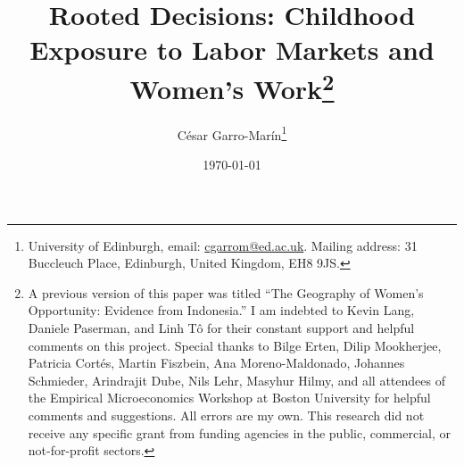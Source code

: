 \title{Rooted Decisions: Childhood Exposure to Labor Markets and Women's Work\thanks{A previous version of this paper was titled ``The Geography of Women's Opportunity: Evidence from Indonesia.'' I am indebted to Kevin Lang, Daniele Paserman, and Linh T\^o for their constant support and helpful comments on this project. Special thanks to Bilge Erten, Dilip Mookherjee, Patricia Cort\'es, Martin Fiszbein, Ana Moreno-Maldonado, Johannes Schmieder, Arindrajit Dube,  Nils Lehr, Masyhur Hilmy, and all attendees of the Empirical Microeconomics Workshop at Boston University for helpful comments and suggestions. All errors are my own. This research did not receive any specific grant from funding agencies in the public, commercial, or not-for-profit sectors.}}	
\date{\today}
\author{C\'esar Garro-Mar\'in\thanks{\noindent University of Edinburgh, email: \href{mailto:cgarrom@ed.ac.uk}{cgarrom@ed.ac.uk}. Mailing address: 31 Buccleuch Place, Edinburgh, United Kingdom, EH8 9JS.}\vspace{-1.5cm}}

